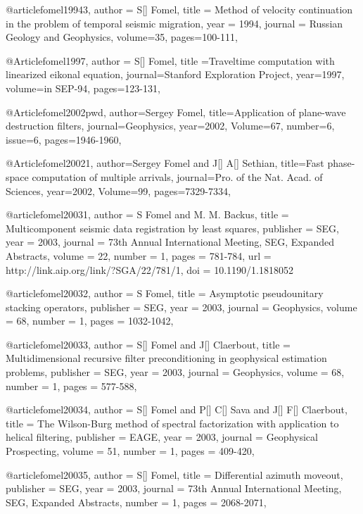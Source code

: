 @article{fomel19943,
  author =	 {S[] Fomel},
  title =	 {Method of velocity continuation in the problem of temporal seismic migration},
  year =	 1994,
  journal =	 {Russian Geology and Geophysics},
  volume={35},
 pages=100-111,
}

@Article{fomel1997,
  author = {S[] Fomel},
  title ={Traveltime computation with linearized eikonal equation},
  journal={Stanford Exploration Project},
  year=1997,
  volume={in SEP-94},
  pages={123-131},
}

@Article{fomel2002pwd,
  author={Sergey Fomel},
  title={Application of plane-wave destruction filters},
  journal={Geophysics},
  year=2002,
  Volume=67,
  number=6,
  issue=6,
  pages={1946-1960},
}



@Article{fomel20021,
  author={Sergey Fomel and J[] A[] Sethian},
  title={Fast phase-space computation of multiple arrivals},
  journal={Pro. of the Nat. Acad. of Sciences},
  year=2002,
  Volume=99,
  pages={7329-7334},
}



@article{fomel20031,
  author =	 {S Fomel and M. M. Backus},
  title =	 {Multicomponent seismic data registration by least
                  squares},
  publisher =	 {SEG},
  year =	 2003,
  journal =	 {73th Annual International Meeting, SEG, Expanded Abstracts},
  volume =	 22,
  number =	 1,
  pages =	 {781-784},
  url =		 {http://link.aip.org/link/?SGA/22/781/1},
  doi =		 {10.1190/1.1818052}
}

@article{fomel20032,
  author =	 {S Fomel},
  title =	 {Asymptotic pseudounitary stacking operators},
  publisher =	 {SEG},
  year =	 2003,
  journal =	 {Geophysics},
  volume =	 68,
  number =	 1,
  pages =	 {1032-1042},
}

@article{fomel20033,
  author =	 {S[] Fomel and J[] Claerbout},
  title =	 {Multidimensional recursive filter preconditioning in geophysical estimation problems},
  publisher =	 {SEG},
  year =	 2003,
  journal =	 {Geophysics},
  volume =	 68,
  number =	 1,
  pages =	 {577-588},
}

@article{fomel20034,
  author =	 {S[] Fomel and P[] C[] Sava and J[] F[] Claerbout},
  title =	 {The Wilson-Burg method of spectral factorization with application to helical filtering},
  publisher =	 {EAGE},
  year =	 2003,
  journal =	 {Geophysical Prospecting},
  volume =	 51,
  number =	 1,
  pages =	 {409-420},
}

@article{fomel20035,
  author =	 {S[] Fomel},
  title =	 {Differential azimuth moveout},
  publisher =	 {SEG},
  year =	 2003,
  journal =	 {73th Annual International Meeting, SEG, Expanded Abstracts},
  number =	 1,
  pages =	 {2068-2071},
}

